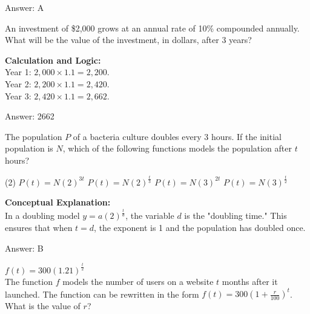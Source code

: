 \documentclass[11pt,paper=a4,answers]{exam}
\begin{document}
\begin{questions}
\begin{solution}
\vspace{25pt}

Answer: \colorbox{yellow!100}{A}
\end{solution}

\vspace{40pt}

\question
An investment of \$2,000 grows at an annual rate of 10\% compounded annually. What will be the value of the investment, in dollars, after 3 years?

\begin{solution}
\textbf{Calculation and Logic:} \\
Year 1: $2,000 \times 1.1 = 2,200$. \\
Year 2: $2,200 \times 1.1 = 2,420$. \\
Year 3: $2,420 \times 1.1 = 2,662$.

\vspace{25pt}

Answer: \colorbox{yellow!100}{2662}
\end{solution}

\question
The population $P$ of a bacteria culture doubles every 3 hours. If the initial population is $N$, which of the following functions models the population after $t$ hours?
\begin{tasks}(2)
    \task $P(t) = N(2)^{3t}$
    \task $P(t) = N(2)^{\frac{t}{3}}$
    \task $P(t) = N(3)^{2t}$
    \task $P(t) = N(3)^{\frac{t}{2}}$
\end{tasks}

\begin{solution}
\textbf{Conceptual Explanation:} \\
In a doubling model $y = a(2)^{\frac{t}{d}}$, the variable $d$ is the "doubling time." This ensures that when $t=d$, the exponent is 1 and the population has doubled once.

\vspace{25pt}

Answer: \colorbox{yellow!100}{B}
\end{solution}

\vspace{40pt}

\question
$f(t) = 300(1.21)^{\frac{t}{2}}$ \\
The function $f$ models the number of users on a website $t$ months after it launched. The function can be rewritten in the form $f(t) = 300(1 + \frac{r}{100})^t$. What is the value of $r$?


\end{questions}
\end{document}
